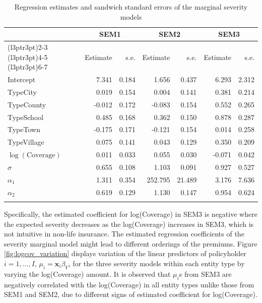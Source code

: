 \documentclass[11pt]{article}
\newcommand{\rev}[1]{{\color{blue}#1}}
\begin{document}
{\begin{table}[!h]
\centering
\begin{tabular}[t]{lrrrrrr}
\toprule
\multicolumn{1}{c}{ } & \multicolumn{2}{c}{SEM1} & \multicolumn{2}{c}{SEM2} & \multicolumn{2}{c}{SEM3} \\
\cmidrule(l{3pt}r{3pt}){2-3} \cmidrule(l{3pt}r{3pt}){4-5} \cmidrule(l{3pt}r{3pt}){6-7}
  & Estimate & s.e. & Estimate & s.e. & Estimate & s.e.\\
\midrule
Intercept & 7.341 & 0.184 & 1.656 & 0.437 & 6.293 & 2.312 \\
TypeCity & 0.019 & 0.154 & 0.004 & 0.141 & 0.381 & 0.214 \\
TypeCounty & -0.012 & 0.172 & -0.083 & 0.154 & 0.552 & 0.265 \\
TypeSchool & 0.485 & 0.168 & 0.362 & 0.150 & 0.878 & 0.287 \\
TypeTown & -0.175 & 0.171 & -0.121 & 0.154 & 0.014 & 0.258 \\
TypeVillage & 0.075 & 0.141 & 0.043 & 0.129 & 0.350 & 0.209 \\
$\log(\mathrm{Coverage})$ & 0.011 & 0.033 & 0.055 & 0.030 & -0.071 & 0.042 \\
$\sigma$ & 0.655 & 0.108 & 1.103 & 0.091 & 0.927 & 0.527 \\
$\alpha_1$ & 1.311 & 0.354 & 252.795 & 21.489 & 3.176 & 7.636 \\
$\alpha_2$ & 0.619 & 0.129 & 1.130 & 0.147 & 0.954 & 0.624 \\
\hhline{=======}
\end{tabular}
\caption{Regression estimates and {sandwich standard errors} of the marginal severity models}
\label{marginalY}
\end{table}

\rev{Specifically, the estimated coefficient for log(Coverage) in SEM3 is negative where the expected severity decreases as the log(Coverage) increases in SEM3, which is not intuitive in non-life insurance. The estimated regression coefficients of the severity marginal model might lead to different orderings of the premiums. Figure \ref{fig:logcov_variation} displays variation of  the linear predictors of policyholder $i=1,\ldots, I$,  $\mu_i=\bm{x}_i\beta_{Y}$, for the three severity models within each entity type by varying the log(Coverage) amount. It is observed that $\mu_i$s from SEM3 are negatively correlated with the log(Coverage) in all entity types unlike those from SEM1 and SEM2, due to different signs of estimated coefficient for log(Coverage).}

}
\end{document}
